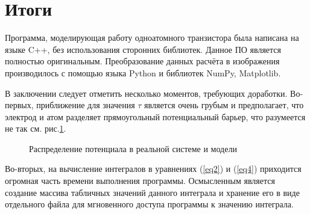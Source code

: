 \documentclass[12pt,a4paper]{report}
\begin{document}
\section*{Итоги}
Программа, моделирующая работу одноатомного транзистора была написана на языке C++, без использования сторонних библиотек. Данное ПО является полностью оригинальным. Преобразование данных расчёта в изображения производилось с помощью языка Python и библиотек NumPy, Matplotlib.

В заключении следует отметить несколько моментов, требующих доработки. Во-первых, приближение для значения $\tau$ является очень грубым и предполагает, что электрод и атом разделяет прямоугольный потенциальный барьер, что разумеется не так см. рис.\ref{fig:barrier}. 
\begin{figure}[h!]
	\caption{Распределение потенциала в реальной системе и модели}
	\label{fig:barrier}
\end{figure}

Во-вторых, на вычисление интегралов в уравнениях (\ref{eq2}) и (\ref{eq4}) приходится огромная часть времени выполнения программы. Осмысленным является создание массива табличных значений данного интеграла и хранение его в виде отдельного файла для мгновенного доступа программы к значению интеграла.
\end{document}
